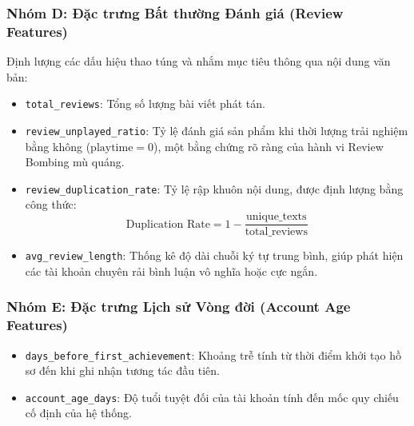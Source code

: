 \subsubsection{Nhóm D: Đặc trưng Bất thường Đánh giá (Review Features)}
Định lượng các dấu hiệu thao túng và nhắm mục tiêu thông qua nội dung văn bản:
\begin{itemize}
    \item \texttt{total\_reviews}: Tổng số lượng bài viết phát tán.
    \item \texttt{review\_unplayed\_ratio}: Tỷ lệ đánh giá sản phẩm khi thời lượng trải nghiệm bằng không ($\text{playtime} = 0$), một bằng chứng rõ ràng của hành vi Review Bombing mù quáng.
    \item \texttt{review\_duplication\_rate}: Tỷ lệ rập khuôn nội dung, được định lượng bằng công thức:
    $$\text{Duplication Rate} = 1 - \frac{\text{unique\_texts}}{\text{total\_reviews}}$$
    \item \texttt{avg\_review\_length}: Thống kê độ dài chuỗi ký tự trung bình, giúp phát hiện các tài khoản chuyên rải bình luận vô nghĩa hoặc cực ngắn.
\end{itemize}

\subsubsection{Nhóm E: Đặc trưng Lịch sử Vòng đời (Account Age Features)}
\begin{itemize}
    \item \texttt{days\_before\_first\_achievement}: Khoảng trễ tính từ thời điểm khởi tạo hồ sơ đến khi ghi nhận tương tác đầu tiên.
    \item \texttt{account\_age\_days}: Độ tuổi tuyệt đối của tài khoản tính đến mốc quy chiếu cố định của hệ thống.
\end{itemize}

